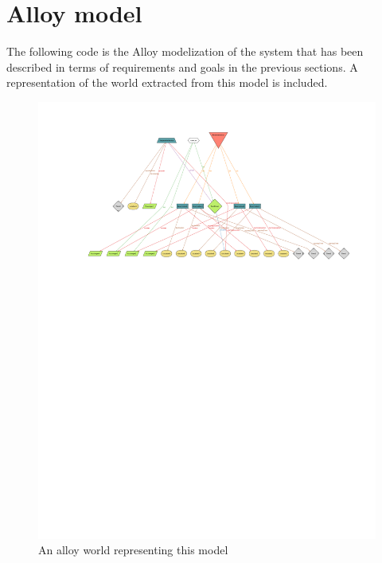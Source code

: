 \section{Alloy model}
The following code is the Alloy modelization of the system that has been described in terms of requirements and goals in the previous sections. A representation of the world extracted from this model is included.

\begin{figure}
\centering
\includegraphics[width=\textwidth]{tex-images/alloy-world}
\caption{An alloy world representing this model}
\end{figure}

